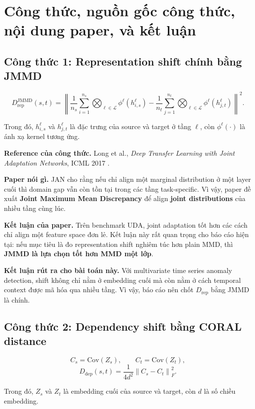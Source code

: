\documentclass[a4paper]{article}
\begin{document}
\section{Công thức, nguồn gốc công thức, nội dung paper, và kết luận}

\subsection{Công thức 1: Representation shift chính bằng JMMD}

\[
D_{\mathrm{rep}}^{\mathrm{JMMD}}(s,t)
= \left\|
\frac{1}{n_s}\sum_{i=1}^{n_s} \bigotimes_{\ell \in \mathcal{L}} \phi^{\ell}(h_{i,s}^{\ell})
-
\frac{1}{n_t}\sum_{j=1}^{n_t} \bigotimes_{\ell \in \mathcal{L}} \phi^{\ell}(h_{j,t}^{\ell})
\right\|^2.
\]

Trong đó, \(h_{i,s}^{\ell}\) và \(h_{j,t}^{\ell}\) là đặc trưng của source và target ở tầng \(\ell\), còn \(\phi^{\ell}(\cdot)\) là ánh xạ kernel tương ứng.

	\textbf{Reference của công thức.} Long et al., \emph{Deep Transfer Learning with Joint Adaptation Networks}, ICML 2017 \cite{jan}.

	\textbf{Paper nói gì.} JAN cho rằng nếu chỉ align một marginal distribution ở một layer cuối thì domain gap vẫn còn tồn tại trong các tầng task-specific. Vì vậy, paper đề xuất \textbf{Joint Maximum Mean Discrepancy} để align \textbf{joint distributions} của nhiều tầng cùng lúc.

	\textbf{Kết luận của paper.} Trên benchmark UDA, joint adaptation tốt hơn các cách chỉ align một feature space đơn lẻ. Kết luận này rất quan trọng cho báo cáo hiện tại: nếu mục tiêu là đo representation shift nghiêm túc hơn plain MMD, thì \textbf{JMMD là lựa chọn tốt hơn MMD một lớp}.

	\textbf{Kết luận rút ra cho bài toán này.} Với multivariate time series anomaly detection, shift không chỉ nằm ở embedding cuối mà còn nằm ở cách temporal context được mã hóa qua nhiều tầng. Vì vậy, báo cáo nên chốt \(D_{\mathrm{rep}}\) bằng JMMD là chính.

\subsection{Công thức 2: Dependency shift bằng CORAL distance}

\[
C_s = \mathrm{Cov}(Z_s),
\qquad
C_t = \mathrm{Cov}(Z_t),
\]
\[
D_{\mathrm{dep}}(s,t) = \frac{1}{4d^2}\left\| C_s - C_t \right\|_F^2.
\]

Trong đó, \(Z_s\) và \(Z_t\) là embedding cuối của source và target, còn \(d\) là số chiều embedding.
\end{document}
